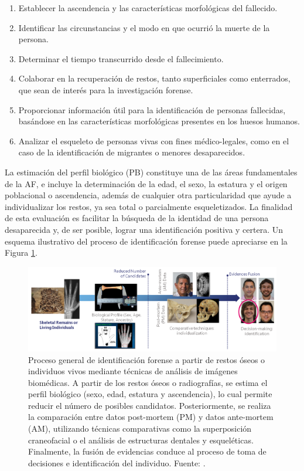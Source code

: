 \begin{enumerate}
    \item Establecer la ascendencia y las características morfológicas del fallecido.
    \item Identificar las circunstancias y el modo en que ocurrió la muerte de la persona.
    \item Determinar el tiempo transcurrido desde el fallecimiento.
    \item Colaborar en la recuperación de restos, tanto superficiales como enterrados, que sean de interés para la investigación forense.
    \item Proporcionar información útil para la identificación de personas fallecidas, basándose en las características morfológicas presentes en los huesos humanos.
    \item Analizar el esqueleto de personas vivas con fines médico-legales, como en el caso de la identificación de migrantes o menores desaparecidos.
\end{enumerate}

La estimación del perfil biológico (PB) constituye una de las áreas fundamentales de la AF, e incluye la determinación de la edad, el sexo, la estatura y el origen poblacional o ascendencia, además de cualquier otra particularidad que ayude a individualizar los restos, ya sea total o parcialmente esqueletizados. La finalidad de esta evaluación es facilitar la búsqueda de la identidad de una persona desaparecida y, de ser posible, lograr una identificación positiva y certera. Un esquema ilustrativo del proceso de identificación forense puede apreciarse en la Figura \ref{fig:intro_1}.

\begin{figure}[h]
    \centering
    \includegraphics[width=1\linewidth]{figures/1_introduction/intro_1.png}
    \caption[Proceso general de identificación forense a partir de restos óseos o individuos vivos]{Proceso general de identificación forense a partir de restos óseos o individuos vivos mediante técnicas de análisis de imágenes biomédicas. A partir de los restos óseos o radiografías, se estima el perfil biológico (sexo, edad, estatura y ascendencia), lo cual permite reducir el número de posibles candidatos. Posteriormente, se realiza la comparación entre datos post-mortem (PM) y datos ante-mortem (AM), utilizando técnicas comparativas como la superposición craneofacial o el análisis de estructuras dentales y esqueléticas. Finalmente, la fusión de evidencias conduce al proceso de toma de decisiones e identificación del individuo. Fuente: \cite{RefWorks:RefID:21-mesejo2020survey}.}
    \label{fig:intro_1}
\end{figure}

